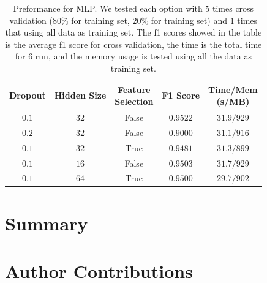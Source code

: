\documentclass[11pt]{article}
\renewcommand\thesection{\arabic{section}}
\begin{document}
\begin{table}[H]
  \centering
  \begin{tabular}{|c|c|c|c|c|}
    \hline
    Dropout & Hidden Size & \makecell{Feature                         \\ Selection} & F1 Score & \makecell{Time/Mem \\ (s/MB)} \\
    \hline
    $0.1$   & $32$        & False             & $0.9522$ & $31.9/929$ \\
    \hline
    $0.2$   & $32$        & False             & $0.9000$ & $31.1/916$ \\
    \hline
    $0.1$   & $32$        & True              & $0.9481$ & $31.3/899$ \\
    \hline
    $0.1$   & $16$        & False             & $0.9503$ & $31.7/929$ \\
    \hline
    $0.1$   & $64$        & True              & $0.9500$ & $29.7/902$ \\
    \hline
  \end{tabular}
  \caption{Preformance for MLP. We tested each option with $5$ times cross validation ($80\%$ for training set, $20\%$ for training set) and $1$ times that using all data as training set. The f1 scores showed in the table is the average f1 score for cross validation, the time is the total time for $6$ run, and the memory usage is tested using all the data as training set.}
  \label{task-3-result-2}
\end{table}

\section{Summary}

\newpage




\newpage

\appendix
\renewcommand\thesection{\Alph{section}}

\section{Author Contributions}

\end{document}
